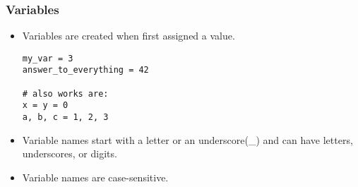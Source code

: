 \documentclass{beamer}
\begin{document}
\begin{frame}[fragile]
\frametitle{Variables}
\begin{itemize}
\item Variables are created when first assigned a value.
\begin{lstlisting}
my_var = 3
answer_to_everything = 42

# also works are:
x = y = 0
a, b, c = 1, 2, 3
\end{lstlisting}
\item Variable names start with a letter or an
      underscore(\_) and can have letters, underscores,
      or digits. 
\item Variable names are case-sensitive.
\end{itemize}
\end{frame}
\end{document}
